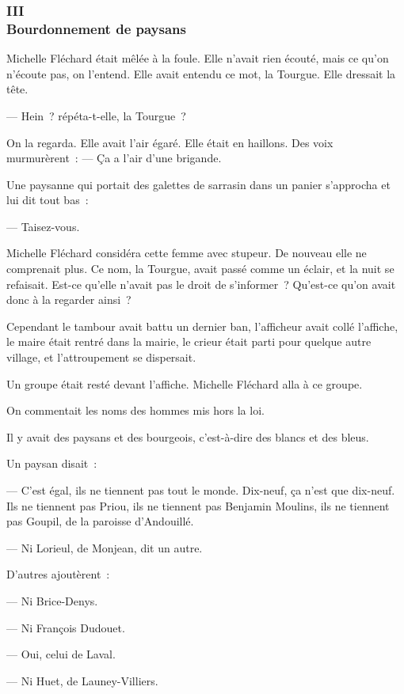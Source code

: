 \documentclass[french,twoside]{book} %
\begin{document}
 \subsubsection[{III. Bourdonnement de paysans}]{III \\
Bourdonnement de paysans}
\label{p3l4c3}
\noindent Michelle Fléchard était mêlée à la foule. Elle n’avait rien écouté, mais ce qu’on n’écoute pas, on l’entend. Elle avait entendu ce mot, la Tourgue. Elle dressait la tête.\par
— Hein ? répéta-t-elle, la Tourgue ?\par
On la regarda. Elle avait l’air égaré. Elle était en haillons. Des voix murmurèrent : — Ça a l’air d’une brigande.\par
Une paysanne qui portait des galettes de sarrasin dans un panier s’approcha et lui dit tout bas :\par
— Taisez-vous.\par
Michelle Fléchard considéra cette femme avec stupeur. De nouveau elle ne comprenait plus. Ce nom, la Tourgue, avait passé comme un éclair, et la nuit se refaisait. Est-ce qu’elle n’avait pas le droit de s’informer ? Qu’est-ce qu’on avait donc à la regarder ainsi ?\par
Cependant le tambour avait battu un dernier ban, l’afficheur avait collé l’affiche, le maire était rentré dans la mairie, le crieur était parti pour quelque autre village, et l’attroupement se dispersait.\par
 Un groupe était resté devant l’affiche. Michelle Fléchard alla à ce groupe.\par
On commentait les noms des hommes mis hors la loi.\par
Il y avait des paysans et des bourgeois, c’est-à-dire des blancs et des bleus.\par
Un paysan disait :\par
— C’est égal, ils ne tiennent pas tout le monde. Dix-neuf, ça n’est que dix-neuf. Ils ne tiennent pas Priou, ils ne tiennent pas Benjamin Moulins, ils ne tiennent pas Goupil, de la paroisse d’Andouillé.\par
— Ni Lorieul, de Monjean, dit un autre.\par
D’autres ajoutèrent :\par
— Ni Brice-Denys.\par
— Ni François Dudouet.\par
— Oui, celui de Laval.\par
— Ni Huet, de Launey-Villiers.\par
\end{document}
